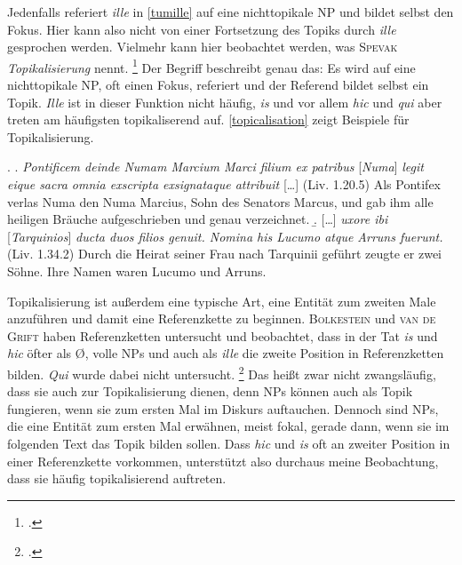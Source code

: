 \documentclass[12pt]{article}
\newcommand{\lat}[1]{\textit{#1}} %
\newcommand{\cntrl}[1]{#1} %
\begin{document}
Jedenfalls referiert \lat{ille} in \ref{tumille} auf eine nichttopikale NP und bildet selbst den Fokus. Hier kann also nicht von einer Fortsetzung des Topiks durch \lat{ille} gesprochen werden. Vielmehr kann hier beobachtet werden, was \textsc{Spevak} \emph{Topikalisierung} nennt.
\footcite[S.\,76]{spevak}
Der Begriff beschreibt genau das: Es wird auf eine nichttopikale NP, oft einen Fokus, referiert und der Referend bildet selbst ein Topik.
\lat{Ille} ist in dieser Funktion nicht häufig, \lat{is} und vor allem \lat{hic} und \lat{qui} aber treten am häufigsten topikaliserend auf.
\ref{topicalisation} zeigt Beispiele für Topikalisierung.

\ex.
\label{topicalisation}
\a.
\label{eiquesacra}
\lat{Pontificem deinde Numam Marcium Marci filium ex patribus} [\lat{Numa}] \lat{legit eique sacra omnia exscripta exsignataque attribuit} [\ldots] (Liv. 1.20.5)
\trans Als Pontifex verlas Numa den Numa Marcius, Sohn des Senators Marcus, und gab ihm alle heiligen Bräuche \cntrl{aufgeschrieben und genau verzeichnet}.
\b.
\label{nominahis}
[\ldots] \lat{uxore ibi} [\lat{Tarquinios}] \lat{ducta duos filios genuit. Nomina his Lucumo atque Arruns fuerunt.} (Liv. 1.34.2)
\trans Durch die Heirat seiner Frau nach Tarquinii geführt zeugte er zwei Söhne. Ihre Namen waren Lucumo und Arruns.

Topikalisierung ist außerdem eine typische Art, eine Entität zum zweiten Male anzuführen und damit eine Referenzkette zu beginnen.
\textsc{Bolkestein} und \textsc{van de Grift} haben Referenzketten untersucht und beobachtet, dass in der Tat \lat{is} und \lat{hic} öfter als Ø, volle NPs und auch als \lat{ille} die zweite Position in Referenzketten bilden. \lat{Qui} wurde dabei nicht untersucht.
\footcite[hier S.\,290]{bolkestein94}
Das heißt zwar nicht zwangsläufig, dass sie auch zur Topikalisierung dienen, denn NPs können auch als Topik fungieren, wenn sie zum ersten Mal im Diskurs auftauchen.
Dennoch sind NPs, die eine Entität zum ersten Mal erwähnen, meist fokal, gerade dann, wenn sie im folgenden Text das Topik bilden sollen.
Dass \lat{hic} und \lat{is} oft an zweiter Position in einer Referenzkette vorkommen, unterstützt also durchaus meine Beobachtung, dass sie häufig topikalisierend auftreten.
\end{document}
